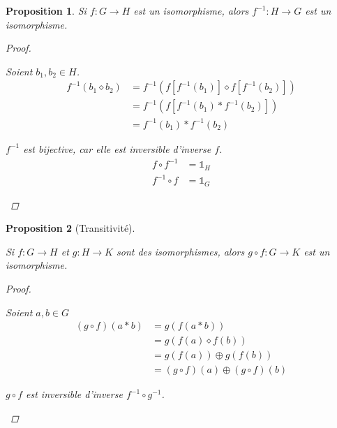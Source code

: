 \documentclass{report}
\newcommand*{\identite}{\mathds{1}}
\newtheorem*{prop}{Proposition}
\theoremstyle{definition}
\theoremstyle{remark}
\begin{document}
	\begin{prop}
		Si $f:G \to H$ est un isomorphisme, alors $f^{-1}:H \to G$ est un isomorphisme.
		\begin{proof}~

			\begin{nlist}
				\item Soient $b_1,b_2 \in H$.
				\begin{align*}
					f^{-1}(b_1 \diamond b_2)&= f^{-1}\left( f\left[ f^{-1}\left( b_1 \right) \right] \diamond f\left[ f^{-1}\left( b_2 \right) \right] \right)\\
					&= f^{-1}\left( f\left[ f^{-1}\left( b_1 \right) * f^{-1}\left( b_2 \right) \right] \right)\\
					&= f^{-1}(b_1) * f^{-1}(b_2)
				\end{align*}
				\item $f^{-1}$ est bijective, car elle est inversible d'inverse $f$.
				\begin{align*}
					f \circ f^{-1}&= \identite_H\\
					f^{-1} \circ f&= \identite_G
				\end{align*}
			\end{nlist}
		\end{proof}
	\end{prop}
	\begin{prop}[Transitivit\'e]~

		Si $f:G \to H$ et $g:H \to K$ sont des isomorphismes, alors $g \circ f:G \to K$ est un isomorphisme.
		\begin{proof}~

			\begin{nlist}
				\item Soient $a,b \in G$
				\begin{align*}
					(g \circ f)(a*b)&= g(f(a*b))\\
					&= g(f(a) \diamond f(b))\\
					&= g(f(a)) \oplus g(f(b))\\
					&= (g \circ f)(a) \oplus (g \circ f)(b)
				\end{align*}
				\item $g \circ f$ est inversible d'inverse $f^{-1} \circ g^{-1}$.
			\end{nlist}
		\end{proof}
	\end{prop}
\end{document}
